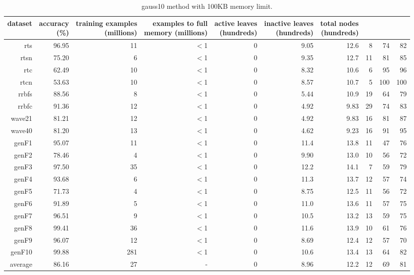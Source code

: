 \clearpage
\begin{table}
\caption{{\sc gauss10} method with 100KB memory limit.}
\label{tab:gauss10-100k}
\centering
\begin{tabular}{|r|r|r|r|r|r|r|r|r|r|}
\hline
dataset	&
\rotatebox{90}{\parbox{9em}{accuracy\\(\%)}} &
\rotatebox{90}{\parbox{9em}{training examples\\(millions)}} &
\rotatebox{90}{\parbox{9em}{examples to full\\memory (millions)}} &
\rotatebox{90}{\parbox{9em}{active leaves\\(hundreds)}} &
\rotatebox{90}{\parbox{9em}{inactive leaves\\(hundreds)}} &
\rotatebox{90}{\parbox{9em}{total nodes\\(hundreds)}} &
\rotatebox{90}{\parbox{9em}{tree depth}}	&
\rotatebox{90}{\parbox{9em}{training speed (\%)}} &
\rotatebox{90}{\parbox{9em}{prediction speed (\%)}} \\
\hline
{\sc rts} & 96.95 & 11 & $<$1 & 0 & 9.05 & 12.6 & 8 & 74 & 82 \\
{\sc rtsn} & 75.20 & 6 & $<$1 & 0 & 9.35 & 12.7 & 11 & 81 & 85 \\
{\sc rtc} & 62.49 & 10 & $<$1 & 0 & 8.32 & 10.6 & 6 & 95 & 96 \\
{\sc rtcn} & 53.63 & 10 & $<$1 & 0 & 8.57 & 10.7 & 5 & 100 & 100 \\
{\sc rrbfs} & 88.56 & 8 & $<$1 & 0 & 5.44 & 10.9 & 19 & 64 & 79 \\
{\sc rrbfc} & 91.36 & 12 & $<$1 & 0 & 4.92 & 9.83 & 29 & 74 & 83 \\
{\sc wave21} & 81.21 & 12 & $<$1 & 0 & 4.92 & 9.83 & 16 & 81 & 87 \\
{\sc wave40} & 81.20 & 13 & $<$1 & 0 & 4.62 & 9.23 & 16 & 91 & 95 \\
{\sc genF1} & 95.07 & 11 & $<$1 & 0 & 11.4 & 13.8 & 11 & 47 & 76 \\
{\sc genF2} & 78.46 & 4 & $<$1 & 0 & 9.90 & 13.0 & 10 & 56 & 72 \\
{\sc genF3} & 97.50 & 35 & $<$1 & 0 & 12.2 & 14.1 & 7 & 59 & 79 \\
{\sc genF4} & 93.68 & 6 & $<$1 & 0 & 11.3 & 13.7 & 12 & 57 & 74 \\
{\sc genF5} & 71.73 & 4 & $<$1 & 0 & 8.75 & 12.5 & 11 & 56 & 72 \\
{\sc genF6} & 91.89 & 5 & $<$1 & 0 & 11.0 & 13.6 & 11 & 57 & 75 \\
{\sc genF7} & 96.51 & 9 & $<$1 & 0 & 10.5 & 13.2 & 13 & 59 & 75 \\
{\sc genF8} & 99.41 & 36 & $<$1 & 0 & 11.6 & 13.9 & 10 & 61 & 76 \\
{\sc genF9} & 96.07 & 12 & $<$1 & 0 & 8.69 & 12.4 & 12 & 57 & 70 \\
{\sc genF10} & 99.88 & 281 & $<$1 & 0 & 10.6 & 13.4 & 13 & 64 & 82 \\
\hline
average & 86.16 & 27 &  -  & 0 & 8.96 & 12.2 & 12 & 69 & 81 \\
\hline
\end{tabular}
\end{table}

